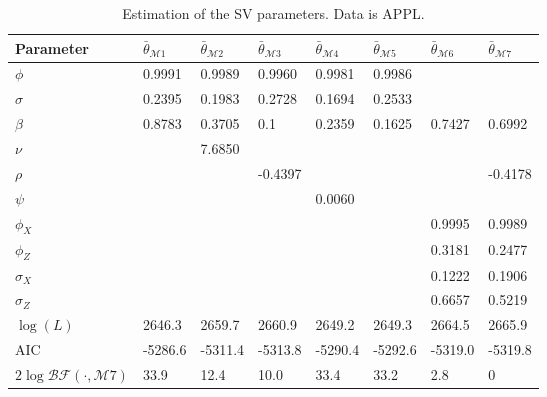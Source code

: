 \documentclass[11pt,a4,twosided,singlespacing,titlepagenumber=on]{scrreprt}
\numberwithin{equation}{chapter} %
\theoremstyle{remark}
\begin{document}
\begin{table}[H]
\centering
\begin{tabular}{llllllll}
Parameter        & $\bar{\theta}_{\mathcal{M}1}$ & $\bar{\theta}_{\mathcal{M}2}$ & $\bar{\theta}_{\mathcal{M}3}$ & $\bar{\theta}_{\mathcal{M}4}$ & $\bar{\theta}_{\mathcal{M}5}$ & $\bar{\theta}_{\mathcal{M}6}$ & $\bar{\theta}_{\mathcal{M}7}$\\ 
\hline
$\phi$								                  & 0.9991  & 0.9989 & 0.9960  & 0.9981 & 0.9986 & \\
$\sigma$                                & 0.2395  & 0.1983 & 0.2728  & 0.1694 & 0.2533 & \\
$\beta$                                 & 0.8783  & 0.3705 & 0.1     & 0.2359 & 0.1625 & 0.7427 & 0.6992\\
$\nu$                                   &         & 7.6850 &         & & &\\
$\rho$                                  &         &        & -0.4397 & & & & -0.4178\\
$\psi$                                  &         &        &         & 0.0060 & & \\
$\phi_X$                                &         &        &         & & & 0.9995 & 0.9989\\
$\phi_Z$                                &         &        &         & & & 0.3181 & 0.2477\\
$\sigma_X$                              &         &        &         & & & 0.1222 & 0.1906\\
$\sigma_Z$                              &         &        &         & & & 0.6657 & 0.5219\\
$\log(L)$                               & 2646.3  & 2659.7 & 2660.9  & 2649.2 & 2649.3 & 2664.5 & 2665.9\\
AIC                                     & -5286.6 & -5311.4 & -5313.8 & -5290.4 & -5292.6 & -5319.0 & -5319.8\\
$2 \log \mathcal{BF}(\cdot, \mathcal{M}7)$& 33.9  & 12.4    & 10.0     & 33.4  & 33.2 & 2.8 & 0\\
\hline
\end{tabular}
\caption{Estimation of the SV parameters. Data is APPL.}
\label{estimation_of_sv_appl}
\end{table}
\end{document}
